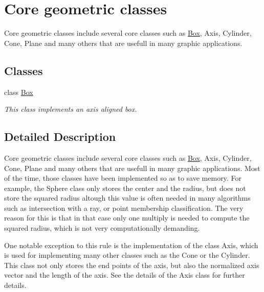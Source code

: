 \hypertarget{group___kernel}{
\section{Core geometric classes}
\label{group___kernel}
}


Core geometric classes include several core classes such as \hyperlink{class_box}{Box}, Axis, Cylinder, Cone, Plane and many others that are usefull in many graphic applications.  


\subsection*{Classes}
\begin{DoxyCompactItemize}
\item 
class \hyperlink{class_box}{Box}
\begin{DoxyCompactList}\small\item\em This class implements an axis aligned box. \item\end{DoxyCompactList}\end{DoxyCompactItemize}


\subsection{Detailed Description}
Core geometric classes include several core classes such as \hyperlink{class_box}{Box}, Axis, Cylinder, Cone, Plane and many others that are usefull in many graphic applications. Most of the time, those classes have been implemented so as to save memory. For example, the Sphere class only stores the center and the radius, but does not store the squared radius altough this value is often needed in many algorithms such as intersection with a ray, or point membership classification. The very reason for this is that in that case only one multiply is needed to compute the squared radius, which is not very computationally demanding.

One notable exception to this rule is the implementation of the class Axis, which is used for implementing many other classes such as the Cone or the Cylinder. This class not only stores the end points of the axis, but also the normalized axis vector and the length of the axis. See the details of the Axis class for further details. 